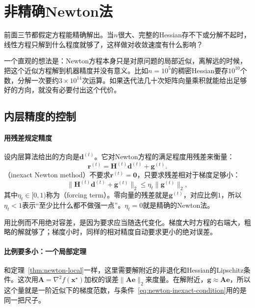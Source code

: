 \section{非精确Newton法}
\label{sec:newton-inexact}

前面三节都假定方程能精确解出。当$n$很大、完整的Hessian存不下或分解不起时，线性方程只解到什么程度就够了，这样做对收敛速度有什么影响？

一个直观的想法是：Newton方程本身只是对原问题的局部近似，离解远的时候，把这个近似方程解到机器精度并没有意义。比如$n=10^5$的稠密Hessian要存$10^{10}$个数，分解一次要约$3\times10^{14}$次运算。如果迭代法几十次矩阵向量乘积就能给出足够好的方向，就没有必要付出这个代价。

\subsection{内层精度的控制}
\label{sec:newton-forcing}

\paragraph{用残差规定精度}
设内层算法给出的方向是$\bm{d}^{(t)}$。它对Newton方程的满足程度用残差来衡量：
\begin{equation}
 \bm{r}^{(t)}=\bm{H}^{(t)}\bm{d}^{(t)}+\bm{g}^{(t)}.
 \label{eq:newton-residual}
\end{equation}
（inexact Newton method）不要求$\bm{r}^{(t)}=\bm{0}$，只要求残差相对于梯度足够小：
\begin{equation}
 \lVert\bm{H}^{(t)}\bm{d}^{(t)}+\bm{g}^{(t)}\rVert_2\leq\eta_t\lVert\bm{g}^{(t)}\rVert_2,
 \label{eq:newton-inexact-condition}
\end{equation}
其中$\eta_t\in[0,1)$称为（forcing term）。零向量的残差就是$\bm{g}^{(t)}$，对应比例$1$，所以$\eta_t<1$表示“至少比什么都不做强一点”。$\eta_t=0$就是精确的Newton法。

用比例而不用绝对容差，是因为要求应当随迭代变化。梯度大时方程的右端大，粗略的解就够了；梯度小时，同样的相对精度自动要求更小的绝对误差。

\paragraph{比例要多小：一个局部定理}
和定理~\ref{thm:newton-local}一样，这里需要解附近的非退化和Hessian的Lipschitz条件。这次用$\bm{A}=\nabla^2f(\bm{x}^\star)$加权的误差$\lVert\bm{A}\bm{e}\rVert_2$来度量。在解附近，$\bm{g}\approx\bm{A}\bm{e}$，所以这个量就是一阶近似下的梯度范数，与条件~\eqref{eq:newton-inexact-condition}用的是同一把尺子。

